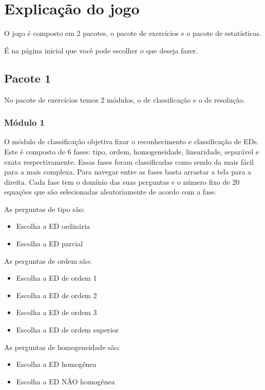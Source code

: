 \chapter[Explicação do jogo]{Explicação do jogo}
O jogo é composto em 2 pacotes, o pacote de exercícios e o pacote de estatísticas.

É na página inicial que você pode escolher o que deseja fazer.



\section[Pacote 1]{Pacote 1}
No pacote de exercícios temos 2 módulos, o de classificação e o de resolução.

\subsection[Módulo 1]{Módulo 1}
O módulo de classificação objetiva fixar o reconhecimento e classificação de EDs. Este é composto de 6 fases: tipo, ordem, homogeneidade, linearidade, separável e exata respectivamente. Essas fases foram classificadas como sendo da mais fácil para a mais complexa. Para navegar entre as fases basta arrastar a tela para a direita.
Cada fase tem o domínio das suas perguntas e o número fixo de 20 equações que são selecionadas aleatoriamente de acordo com a fase.

As perguntas de tipo são: 
\begin{itemize}
	\item{}Escolha a ED ordinária
	\item{}Escolha a ED parcial
\end{itemize}


As perguntas de ordem são:
\begin{itemize}
	\item{}Escolha a ED de ordem 1
	\item{}Escolha a ED de ordem 2
	\item{}Escolha a ED de ordem 3
	\item{}Escolha a ED de ordem superior
\end{itemize}
 	

As perguntas de homogeneidade são:
\begin{itemize}
	\item{}Escolha a ED homogênea
	\item{}Escolha a ED NÃO homogênea
\end{itemize}
					
